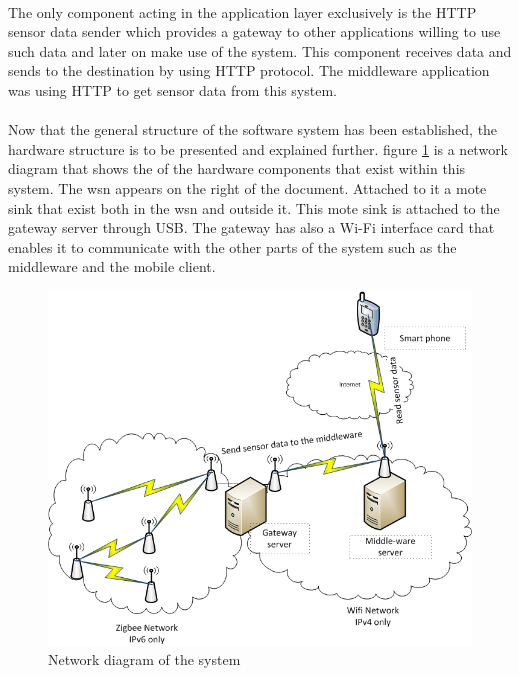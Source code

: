 \documentclass[oneside,12pt,a4paper,final]{book}
\begin{document}
\paragraph{}
The only component acting in the application layer exclusively is the HTTP sensor data sender which provides a gateway to other applications willing to use such data and later on make use of the system. This component receives data and sends to the destination by using HTTP protocol. The middleware application was using HTTP to get sensor data from this system.
\paragraph{}
Now that the general structure of the software system has been established, the hardware structure is to be presented and explained further. figure \ref{fig:network_diagram} is a network diagram that shows the of the hardware components that exist within this system. The \gls{wsn} appears on the right of the document. Attached to it a mote sink that exist both in the \gls{wsn} and outside it. This mote sink is attached to the gateway server through USB. The gateway has also a Wi-Fi interface card that enables it to communicate with the other parts of the system such as the middleware and the mobile client.

\begin{figure}[htbp]
\centering
\includegraphics[scale=0.8]{img/network_diagram.jpg}
\caption{Network diagram of the system}
\label{fig:network_diagram}
\end{figure}
\end{document}
